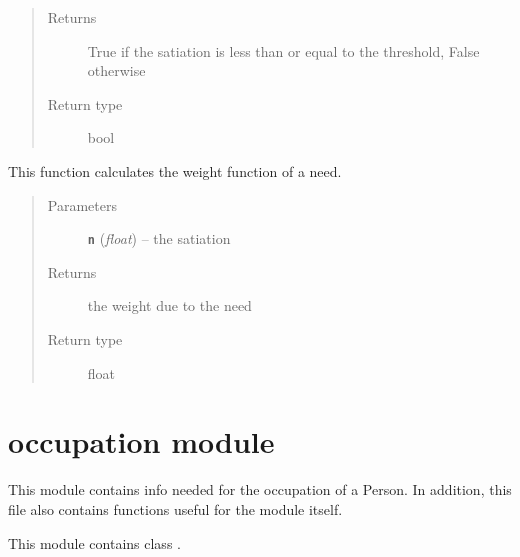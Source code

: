 \documentclass[letterpaper,10pt,english]{sphinxmanual}
\begin{document}
\begin{fulllineitems}
\begin{fulllineitems}
\begin{quote}
\begin{description}
\item[{Returns}] \leavevmode
True if the satiation is less than or equal to the threshold, False otherwise

\item[{Return type}] \leavevmode
bool

\end{description}\end{quote}

\end{fulllineitems}


\begin{fulllineitems}
\label{need:need.Need.weight}
This function calculates the weight function of a need.
\begin{quote}\begin{description}
\item[{Parameters}] \leavevmode
\textbf{\texttt{n}} (\emph{float}) -- the satiation

\item[{Returns}] \leavevmode
the weight due to the  need

\item[{Return type}] \leavevmode
float

\end{description}\end{quote}

\end{fulllineitems}


\end{fulllineitems}



\section{occupation module}
\label{occupation::doc}\label{occupation:module-occupation}\label{occupation:occupation-module}
This module contains info needed for the occupation of a Person. In addition, this file also contains functions useful for the module itself.

This module contains class {\hyperref[occupation:occupation.Occupation]{\emph{}}}.
\end{document}
